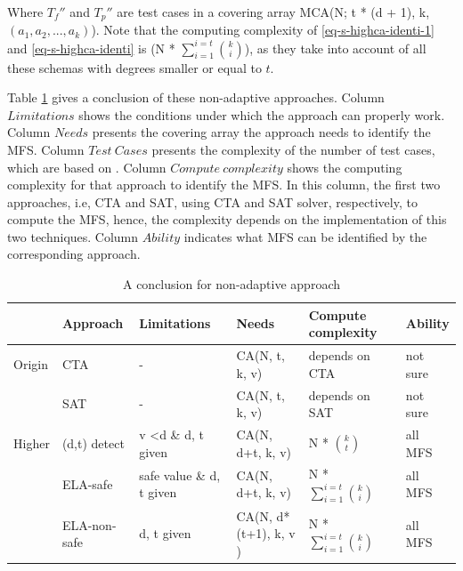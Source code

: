 \documentclass[10pt,journal,cspaper,compsoc]{IEEEtran}
\begin{document}
Where $T_{f}''$ and $T_{p}''$ are test cases in a covering array MCA(N; t * (d + 1), k, $(a_{1}, a_{2}, ..., a_{k})$). Note that the computing complexity of \ref{eq-s-highca-identi-1} and \ref{eq-s-highca-identi} is (N * $\sum_{i = 1}^{i = t} \binom{k}{i}$), as they take into account of all these schemas with degrees smaller or equal to $t$.

Table \ref{non-adaptive-conclusion}  gives a conclusion of these non-adaptive approaches. Column $Limitations$ shows the conditions under which the approach can properly work. Column $Needs$ presents the covering array the approach needs to identify the MFS. Column $Test\ Cases$ presents the complexity of the number of test cases, which are based on \cite{bryce2009density}.  Column $Compute\ complexity$ shows the computing complexity for that approach to identify the MFS. In this column, the first two approaches, i.e, CTA and SAT, using CTA and SAT solver, respectively, to compute the MFS, hence, the complexity depends on the implementation of this two techniques.  Column $Ability$ indicates what MFS can be identified by the corresponding approach.

\begin{table}[htbp]
\centering
\caption{A conclusion for non-adaptive approach}
\label{non-adaptive-conclusion}
\begin{tabular}{|l|l|l|l|l|l|}
\hline
         & Approach     & Limitations          & Needs                         & Compute complexity           & Ability                      \\ \hline
Origin & CTA          & -                      & CA(N, t, k, v)                   & depends on CTA & not sure         \\
         & SAT          & -                         & CA(N, t, k, v)                   & depends on SAT       & not sure         \\ \hline
Higher   & (d,t) detect & v \textless d \& d, t given & CA(N, d+t, k, v)             & N * $ \binom{k}{t}$                        & all  MFS  \\
         & ELA-safe     & safe value \& d, t given    & CA(N, d+t, k, v)             & N * $\sum_{i = 1}^{i = t} \binom{k}{i}$                        & all  MFS  \\
         & ELA-non-safe & d, t given                & CA(N, d*(t+1), k, v )          & N * $\sum_{i = 1}^{i = t} \binom{k}{i}$                        & all  MFS \\ \hline
\end{tabular}
\end{table}
\end{document}

